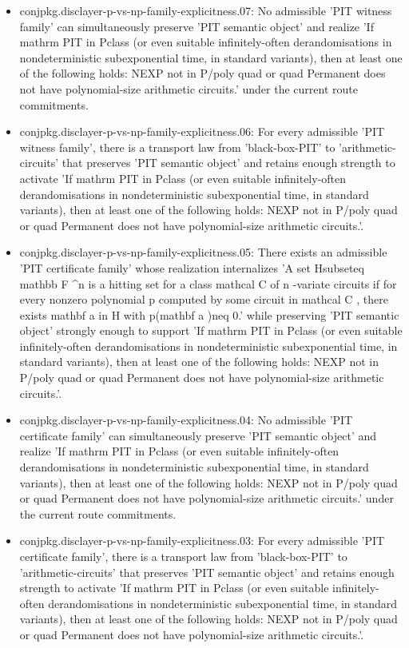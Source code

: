 \documentclass[11pt]{article}
\begin{document}
\begin{itemize}
\item conjpkg.disclayer-p-vs-np-family-explicitness.07: No admissible 'PIT witness family' can simultaneously preserve 'PIT semantic object' and realize 'If mathrm PIT in Pclass (or even suitable infinitely-often derandomisations in nondeterministic subexponential time, in standard variants), then at least one of the following holds: NEXP not in P/poly quad or quad Permanent does not have polynomial-size arithmetic circuits.' under the current route commitments.
\item conjpkg.disclayer-p-vs-np-family-explicitness.06: For every admissible 'PIT witness family', there is a transport law from 'black-box-PIT' to 'arithmetic-circuits' that preserves 'PIT semantic object' and retains enough strength to activate 'If mathrm PIT in Pclass (or even suitable infinitely-often derandomisations in nondeterministic subexponential time, in standard variants), then at least one of the following holds: NEXP not in P/poly quad or quad Permanent does not have polynomial-size arithmetic circuits.'.
\item conjpkg.disclayer-p-vs-np-family-explicitness.05: There exists an admissible 'PIT certificate family' whose realization internalizes 'A set Hsubseteq mathbb F \textasciicircum{}n is a hitting set for a class mathcal C of n -variate circuits if for every nonzero polynomial p computed by some circuit in mathcal C , there exists mathbf a in H with p(mathbf a )neq 0.' while preserving 'PIT semantic object' strongly enough to support 'If mathrm PIT in Pclass (or even suitable infinitely-often derandomisations in nondeterministic subexponential time, in standard variants), then at least one of the following holds: NEXP not in P/poly quad or quad Permanent does not have polynomial-size arithmetic circuits.'.
\item conjpkg.disclayer-p-vs-np-family-explicitness.04: No admissible 'PIT certificate family' can simultaneously preserve 'PIT semantic object' and realize 'If mathrm PIT in Pclass (or even suitable infinitely-often derandomisations in nondeterministic subexponential time, in standard variants), then at least one of the following holds: NEXP not in P/poly quad or quad Permanent does not have polynomial-size arithmetic circuits.' under the current route commitments.
\item conjpkg.disclayer-p-vs-np-family-explicitness.03: For every admissible 'PIT certificate family', there is a transport law from 'black-box-PIT' to 'arithmetic-circuits' that preserves 'PIT semantic object' and retains enough strength to activate 'If mathrm PIT in Pclass (or even suitable infinitely-often derandomisations in nondeterministic subexponential time, in standard variants), then at least one of the following holds: NEXP not in P/poly quad or quad Permanent does not have polynomial-size arithmetic circuits.'.

\end{itemize}
\end{document}
